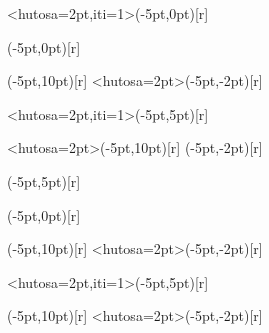\documentclass[landscape,a4j]{jarticle}
\begin{document}
\begin{zyukeizu}
  \eda[1]<hutosa=2pt,iti=1>(-5pt,0pt)[r]{%
    \begin{zyukeizu}%
      (-5pt,0pt)[r]{%
        \begin{zyukeizu}%
          \eda[0](-5pt,10pt)[r]{ }%
          \eda[3]<hutosa=2pt>(-5pt,-2pt)[r]{ }%
        \end{zyukeizu}%
      }%
      \eda[2]<hutosa=2pt,iti=1>(-5pt,5pt)[r]{%
        \begin{zyukeizu}%
          \eda[2]<hutosa=2pt>(-5pt,10pt)[r]{ }%
          \eda[0](-5pt,-2pt)[r]{ }%
        \end{zyukeizu}%
      }%
    \end{zyukeizu}%
  }%
  (-5pt,5pt)[r]{%
    \begin{zyukeizu}%
      (-5pt,0pt)[r]{%
        \begin{zyukeizu}%
          \eda[1](-5pt,10pt)[r]{ }%
          \eda[2]<hutosa=2pt>(-5pt,-2pt)[r]{ }%
        \end{zyukeizu}%
      }%
      \eda[1]<hutosa=2pt,iti=1>(-5pt,5pt)[r]{%
        \begin{zyukeizu}%
          \eda[0](-5pt,10pt)[r]{ }%
          \eda[1]<hutosa=2pt>(-5pt,-2pt)[r]{ }%
        \end{zyukeizu}%
      }%
    \end{zyukeizu}%
  }%
\end{zyukeizu}%
\end{document}
